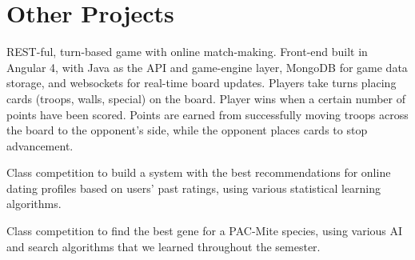 \documentclass[letterpaper]{deedy-resume} %
\begin{document}
\begin{minipage}[t]{0.66\textwidth} %


\section{Other Projects}



REST-ful, turn-based game with online match-making. Front-end built in Angular 4, with Java as the API and game-engine layer, MongoDB for game data storage, and websockets for real-time board updates. Players take turns placing cards (troops, walls, special) on the board. Player wins when a certain number of points have been scored. Points are earned from successfully moving troops across the board to the opponent's side, while the opponent places cards to stop advancement. 

\sectionspace %



Class competition to build a system with the best recommendations for online dating profiles based on users' past ratings, using various statistical learning algorithms.

\sectionspace %



Class competition to find the best gene for a PAC-Mite species, using various AI and search algorithms that we learned throughout the semester.

\sectionspace %




\end{minipage}
\end{document}
